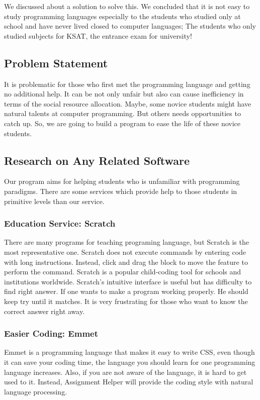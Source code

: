 \documentclass[conference]{IEEEtran}
\begin{document}
We discussed about a solution to solve this. We concluded that it is not easy to study programming languages especially to the students who studied only at school and have never lived closed to computer languages; The students who only studied subjects for KSAT, the entrance exam for university!

\subsection{Problem Statement}
It is problematic for those who first met the programming language and getting no additional help. It can be not only unfair but also can cause inefficiency in terms of the social resource allocation. Maybe, some novice students might have natural talents at computer programming. But others needs opportunities to catch up. So, we are going to build a program to ease the life of these novice students.


\subsection{Research on Any Related Software}
Our program aims for helping students who is unfamiliar with programming paradigms. There are some services which provide help to those students in primitive levels than our service.

\subsubsection{Education Service: Scratch}
There are many programs for teaching programing language, but Scratch is the most representative one. Scratch does not execute commands by entering code with long instructions. Instead, click and drag the block to move the feature to perform the command. Scratch is a popular child-coding tool for schools and institutions worldwide. Scratch's intuitive interface is useful but has difficulty to find right answer. If one wants to make a program working properly. He should keep try until it matches. It is very frustrating for those who want to know the correct answer right away.

\subsubsection{Easier Coding: Emmet}
Emmet is a programming language that makes it easy to write CSS, even though it can save your coding time, the language you should learn for one programming language increases. Also, if you are not aware of the language, it is hard to get used to it. Instead, Assignment Helper will provide the coding style with natural language processing.
\end{document}
